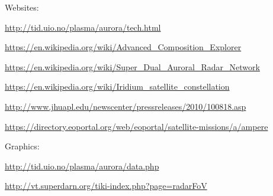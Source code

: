 \documentclass[10pt,a4paper]{article}
\begin{document}
Websites:

	\url{http://tid.uio.no/plasma/aurora/tech.html}
	
	\url{https://en.wikipedia.org/wiki/Advanced_Composition_Explorer}
	
	\url{https://en.wikipedia.org/wiki/Super_Dual_Auroral_Radar_Network}
	
	\url{https://en.wikipedia.org/wiki/Iridium_satellite_constellation}
	
	\url{http://www.jhuapl.edu/newscenter/pressreleases/2010/100818.asp}
	
	\url{https://directory.eoportal.org/web/eoportal/satellite-missions/a/ampere}
	
Graphics:

	\url{http://tid.uio.no/plasma/aurora/data.php}
	
	\url{http://vt.superdarn.org/tiki-index.php?page=radarFoV}
\end{document}
